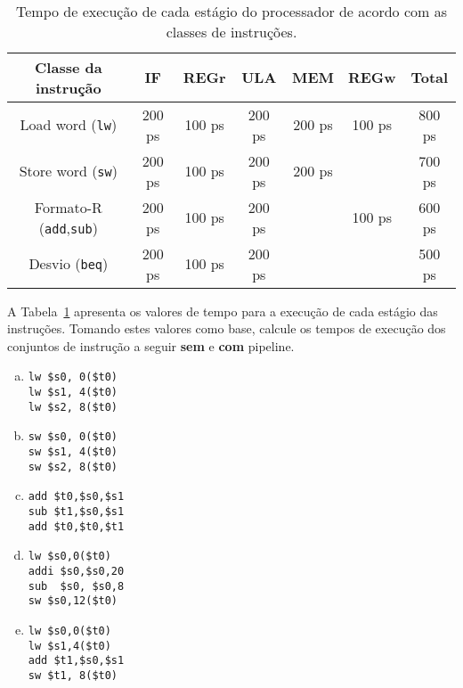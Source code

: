
\\

\begin{table}[h]
  \begin{tabular}{|c|c|c|c|c|c|c|}\hline
    \bf Classe da instrução & \bf IF & \bf REGr & \bf ULA & \bf MEM &
    \bf REGw & \bf Total
    \\\hline\hline
    Load word ({\tt lw}) & 200 ps & 100 ps & 200 ps & 200 ps & 100 ps
    & 800 ps \\\hline
    Store word ({\tt sw}) & 200 ps & 100 ps & 200 ps & 200 ps & 
    & 700 ps \\\hline
    Formato-R ({\tt add},{\tt sub}) & 200 ps & 100 ps & 200 ps &  & 100 ps
    & 600 ps \\\hline
    Desvio ({\tt beq}) & 200 ps & 100 ps & 200 ps &  & 
    & 500 ps \\\hline
  \end{tabular}

  \caption{Tempo de execução de cada estágio do processador de acordo
  com as classes de instruções.}
 \label{tab:texec}
\end{table}

\exercise A Tabela~\ref{tab:texec} apresenta os valores de tempo para
a execução de cada estágio das instruções. Tomando estes valores como
base, calcule os tempos de execução dos conjuntos de instrução a
seguir {\bf sem} e {\bf com} pipeline.

\begin{enumerate}[a)]

\item 
\begin{lstlisting}
lw $s0, 0($t0)
lw $s1, 4($t0)
lw $s2, 8($t0)
\end{lstlisting}

\item 
\begin{lstlisting}
sw $s0, 0($t0)
sw $s1, 4($t0)
sw $s2, 8($t0)
\end{lstlisting}

\item
\begin{lstlisting}
add $t0,$s0,$s1
sub $t1,$s0,$s1
add $t0,$t0,$t1
\end{lstlisting}


\item 
\begin{lstlisting}
lw $s0,0($t0)
addi $s0,$s0,20
sub  $s0, $s0,8
sw $s0,12($t0)
\end{lstlisting}

\item
\begin{lstlisting}
lw $s0,0($t0)
lw $s1,4($t0)
add $t1,$s0,$s1
sw $t1, 8($t0)
\end{lstlisting}

\end{enumerate}

